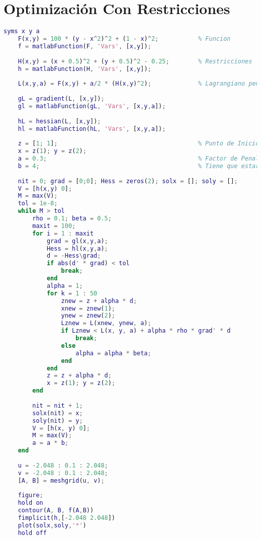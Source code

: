 \section*{Optimización Con Restricciones}

\begin{lstlisting}[caption={Método del Penalty}, language = Matlab]
    syms x y a
    F(x,y) = 100 * (y - x^2)^2 + (1 - x)^2;           % Funcion
    f = matlabFunction(F, 'Vars', [x,y]);
    
    H(x,y) = (x + 0.5)^2 + (y + 0.5)^2 - 0.25;        % Restricciones
    h = matlabFunction(H, 'Vars', [x,y]);
    
    L(x,y,a) = F(x,y) + a/2 * (H(x,y)^2);             % Lagrangiano penalizado
    
    gL = gradient(L, [x,y]);
    gl = matlabFunction(gL, 'Vars', [x,y,a]);
    
    hL = hessian(L, [x,y]);
    hl = matlabFunction(hL, 'Vars', [x,y,a]);
    
    z = [1; 1];                                       % Punto de Inicio
    x = z(1); y = z(2);
    a = 0.3;                                          % Factor de Penalizacion Inicial NO MUY GRANDE
    b = 4;                                            % Tiene que estar entre 4 y 10
    
    nit = 0; grad = [0;0]; Hess = zeros(2); solx = []; soly = [];
    V = [h(x,y) 0];
    M = max(V);
    tol = 1e-8;
    while M > tol
        rho = 0.1; beta = 0.5;
        maxit = 100;
        for i = 1 : maxit
            grad = gl(x,y,a);
            Hess = hl(x,y,a);
            d = -Hess\grad;
            if abs(d' * grad) < tol
                break;
            end
            alpha = 1; 
            for k = 1 : 50   
                znew = z + alpha * d;
                xnew = znew(1);
                ynew = znew(2);
                Lznew = L(xnew, ynew, a);
                if Lznew < L(x, y, a) + alpha * rho * grad' * d
                    break;
                else 
                    alpha = alpha * beta;
                end
            end
            z = z + alpha * d;
            x = z(1); y = z(2);
        end
    
        nit = nit + 1;
        solx(nit) = x;
        soly(nit) = y;
        V = [h(x, y) 0];
        M = max(V);
        a = a * b;
    end
    
    u = -2.048 : 0.1 : 2.048; 
    v = -2.048 : 0.1 : 2.048;
    [A, B] = meshgrid(u, v);
    
    figure;
    hold on
    contour(A, B, f(A,B))
    fimplicit(h,[-2.048 2.048])
    plot(solx,soly,'*')
    hold off
\end{lstlisting}

